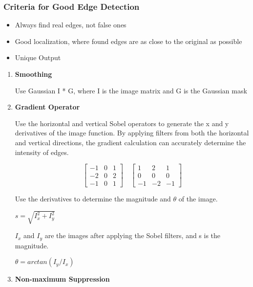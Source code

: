 \documentclass{article}
\begin{document}
\begin{multicols}{2}
\subsubsection{Criteria for Good Edge Detection}
\begin{itemize}
      \item Always find real edges, not false ones
  
      \item Good localization, where found edges are as close to the original as possible
  
      \item Unique Output
\end{itemize}

\begin{enumerate}
        \item \textbf{Smoothing}
        
        Use Gaussian I * G, where I is the image matrix and G is the Gaussian mask
        \item \textbf{Gradient Operator}
        
        Use the horizontal and vertical Sobel operators to generate the x and y derivatives of the image function.
        By applying filters from both the horizontal and vertical directions, the gradient calculation can accurately determine the intensity of edges.

        \[
          \begin{bmatrix}
            -1 & 0 & 1\\
            -2 & 0 & 2\\
            -1 & 0 & 1
          \end{bmatrix}\quad
          \begin{bmatrix}
            1 & 2 & 1\\
            0 & 0 & 0\\
            -1 & -2 & -1
          \end{bmatrix}
        \]

        Use the derivatives to determine the magnitude and $\theta$ of the image.
        
        $s = \sqrt{I_x^2 + I_y^2}$

        $I_x$ and $I_y$ are the images after applying the Sobel filters, and s is the magnitude.

        $\theta = arctan(I_y/I_x)$

        \item \textbf{Non-maximum Suppression}
        

\end{enumerate}
\end{multicols}
\end{document}
